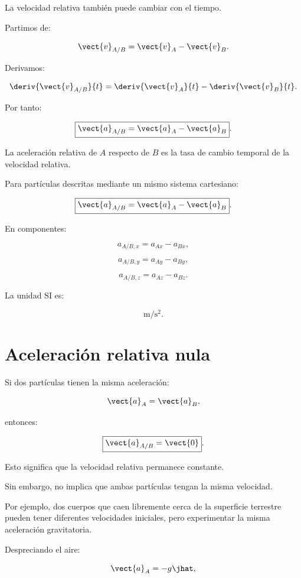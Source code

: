 La velocidad relativa también puede cambiar con el tiempo.

Partimos de:

\[
\vect{v}_{A/B}=\vect{v}_A-\vect{v}_B.
\]

Derivamos:

\[
\deriv{\vect{v}_{A/B}}{t}
=
\deriv{\vect{v}_A}{t}
-
\deriv{\vect{v}_B}{t}.
\]

Por tanto:

\[
\boxed{
\vect{a}_{A/B}=\vect{a}_A-\vect{a}_B
}.
\]

\begin{definicion}

La aceleración relativa de \(A\) respecto de \(B\) es
la tasa de cambio temporal de la velocidad relativa.

Para partículas descritas mediante un mismo sistema
cartesiano:

\[
\boxed{
\vect{a}_{A/B}=\vect{a}_A-\vect{a}_B
}.
\]

\end{definicion}

En componentes:

\[
\boxed{
a_{A/B,x}=a_{Ax}-a_{Bx}
},
\]

\[
\boxed{
a_{A/B,y}=a_{Ay}-a_{By}
},
\]

\[
\boxed{
a_{A/B,z}=a_{Az}-a_{Bz}
}.
\]

La unidad SI es:

\[
\si{\meter\per\second\squared}.
\]


\section{Aceleración relativa nula}

Si dos partículas tienen la misma aceleración:

\[
\vect{a}_A=\vect{a}_B,
\]

entonces:

\[
\boxed{
\vect{a}_{A/B}=\vect{0}
}.
\]

Esto significa que la velocidad relativa permanece constante.

Sin embargo, no implica que ambas partículas tengan
la misma velocidad.

Por ejemplo, dos cuerpos que caen libremente cerca
de la superficie terrestre pueden tener diferentes
velocidades iniciales, pero experimentar la misma
aceleración gravitatoria.

Despreciando el aire:

\[
\vect{a}_A=-g\jhat,
\]

